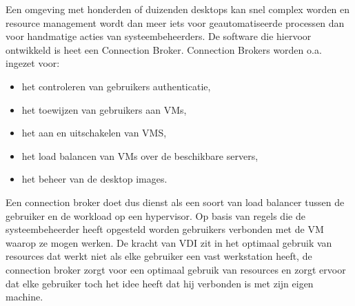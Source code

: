 Een omgeving met honderden of duizenden desktops kan snel complex worden en resource management wordt dan meer iets voor geautomatiseerde processen dan voor handmatige acties van systeembeheerders. De software die hiervoor ontwikkeld is heet een Connection Broker. Connection Brokers worden o.a. ingezet voor:
\begin{itemize}
\item het controleren van gebruikers authenticatie,
\item het toewijzen van gebruikers aan VMs,
\item het aan en uitschakelen van VMS,
\item het load balancen van VMs over de beschikbare servers,
\item het beheer van de desktop images.
\end{itemize}

Een connection broker doet dus dienst als een soort van load balancer tussen de gebruiker en de workload op een hypervisor. Op basis van regels die de systeembeheerder heeft opgesteld worden gebruikers verbonden met de VM waarop ze mogen werken. De kracht van VDI zit in het optimaal gebruik van resources dat werkt niet als elke gebruiker een vast werkstation heeft, de connection broker zorgt voor een optimaal gebruik van resources en zorgt ervoor dat elke gebruiker toch het idee heeft dat hij verbonden is met zijn eigen machine.
